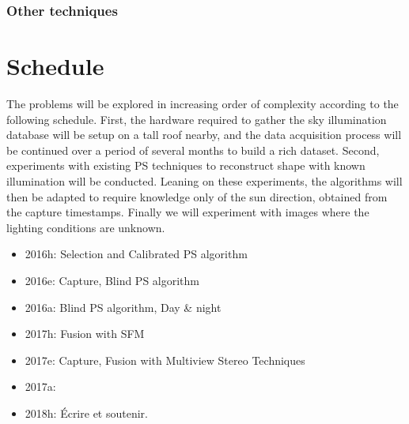 \documentclass{report}
\begin{document}



\subsection{Other techniques}







\chapter{Schedule}

The problems will be explored in increasing order of complexity according to the following schedule. First, the hardware required to gather the sky illumination database will be setup on a tall roof nearby, and the data acquisition process will be continued over a period of several months to build a rich dataset. Second, experiments with existing PS techniques to reconstruct shape with known illumination will be conducted. Leaning on these experiments, the algorithms will then be adapted to require knowledge only of the sun direction, obtained from the capture timestamps. Finally we will experiment with images where the lighting conditions are unknown.

\begin{itemize}
	\item 2016h: Selection and Calibrated PS algorithm
	\item 2016e: Capture, Blind PS algorithm
	\item 2016a: Blind PS algorithm, Day \& night
	\item 2017h: Fusion with SFM
	\item 2017e: Capture, Fusion with Multiview Stereo Techniques
	\item 2017a:
	\item 2018h: Écrire et soutenir.
\end{itemize}
\end{document}
